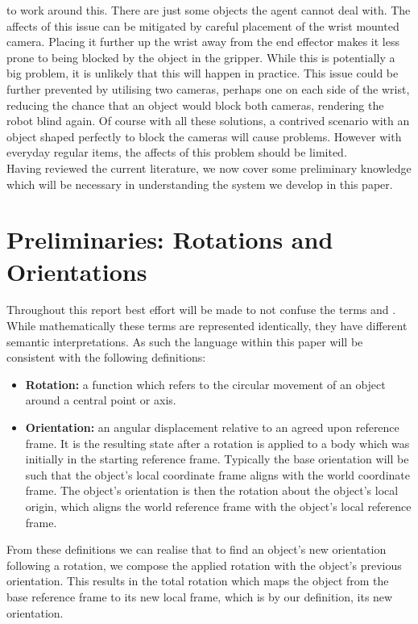 to work around this. There are just some objects the agent cannot deal with. The affects of this issue can be mitigated by careful placement of the wrist mounted camera. Placing it further up the wrist away from the end effector makes it less prone to being blocked by the object in the gripper. While this is potentially a big problem, it is unlikely that this will happen in practice. This issue could be further prevented by utilising two cameras, perhaps one on each side of the wrist, reducing the chance that an object would block both cameras, rendering the robot blind again. Of course with all these solutions, a contrived scenario with an object shaped perfectly to block the cameras will cause problems. However with everyday regular items, the affects of this problem should be limited.\\

Having reviewed the current literature, we now cover some preliminary knowledge which will be necessary in understanding the system we develop in this paper.

\section{Preliminaries: Rotations and Orientations}
\label{sec:rotations}
Throughout this report best effort will be made to not confuse the terms  and . While mathematically these terms are represented identically, they have different semantic interpretations. As such the language within this paper will be consistent with the following definitions:
\begin{itemize}
    \item \textbf{Rotation:} a function which refers to the circular movement of an object around a central point or axis.
    \item \textbf{Orientation:} an angular displacement relative to an agreed upon reference frame. It is the resulting state after a rotation is applied to a body which was initially in the starting reference frame. Typically the base orientation will be such that the object's local coordinate frame aligns with the world coordinate frame. The object's orientation is then the rotation about the object's local origin, which aligns the world reference frame with the object's local reference frame.
\end{itemize}

From these definitions we can realise that to find an object's new orientation following a rotation, we compose the applied rotation with the object's previous orientation. This results in the total rotation which maps the object from the base reference frame to its new local frame, which is by our definition, its new orientation.\\


